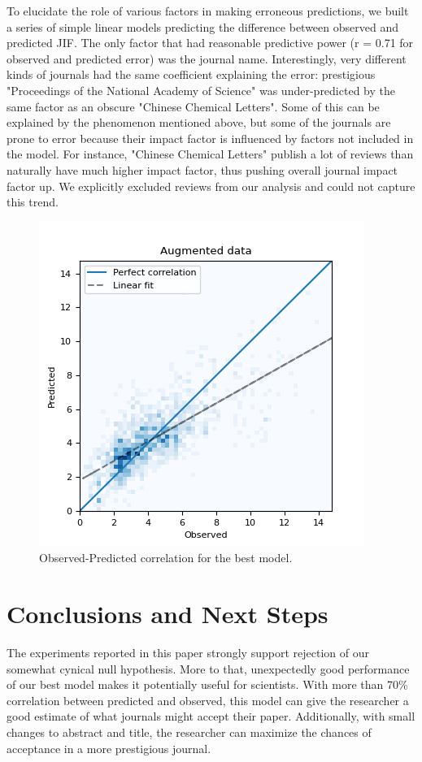 \documentclass[11pt]{article}
\begin{document}
To elucidate the role of various factors in making erroneous predictions, we built a series of simple linear models predicting the difference between observed and predicted JIF. The only factor that had reasonable predictive power (r = 0.71 for observed and predicted error) was the journal name. Interestingly, very different kinds of journals had the same coefficient explaining the error: prestigious "Proceedings of the National Academy of Science" was under-predicted by the same factor as an obscure "Chinese Chemical Letters". Some of this can be explained by the phenomenon mentioned above, but some of the journals are prone to error because their impact factor is influenced by factors not included in the model. For instance, "Chinese Chemical Letters" publish a lot of reviews than naturally have much higher impact factor, thus pushing overall journal impact factor up. We explicitly excluded reviews from our analysis and could not capture this trend.
\begin{figure}
	\includegraphics[width= \columnwidth]{./Images/Best model.png}
	\caption{Observed-Predicted correlation for the best model.}
	\label{fig:best_model_corr}
\end{figure}
\section{Conclusions and Next Steps}
The experiments reported in this paper strongly support rejection of our somewhat cynical null hypothesis. More to that, unexpectedly good performance of our best model makes it potentially useful for scientists. With more than 70\% correlation between predicted and observed, this model can give the researcher a good estimate of what journals might accept their paper. Additionally, with small changes to abstract and title, the researcher can maximize the chances of acceptance in a more prestigious journal. 
\end{document}
